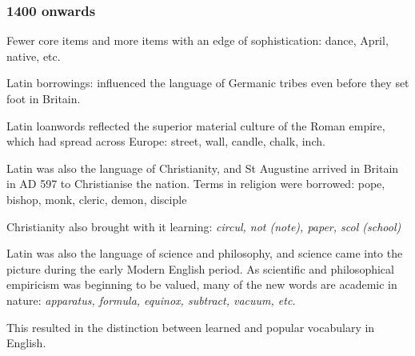 \documentclass[../main.tex]{subfiles}
\begin{document}
	\subsubsection{1400 onwards}
	Fewer core items and more items with an edge of sophistication: dance, April, native, etc. \par \par
	Latin borrowings: influenced the language of Germanic tribes even before they set foot in Britain.  \par
	Latin loanwords reflected the superior material culture of the Roman empire, which had spread across Europe: street, wall, candle, chalk, inch. \par
	Latin was also the language of Christianity, and St Augustine arrived in Britain in AD 597 to Christianise the nation. Terms in religion were borrowed: pope, bishop, monk, cleric, demon, disciple \par
	Christianity also brought with it learning: \textit{circul, not (note), paper, scol (school)} \par
	Latin was also the language of science and philosophy, and science came into the picture during the early Modern English period. As scientific and philosophical empiricism was beginning to be valued, many of the new words are academic in nature: \textit{apparatus, formula, equinox, subtract, vacuum, etc.} \par
	This resulted in the distinction between learned and popular vocabulary in English. \par
\end{document}
